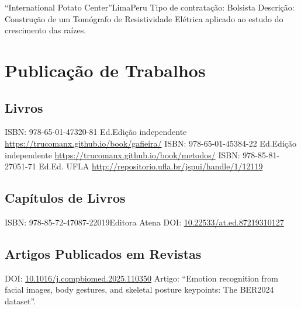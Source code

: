 \documentclass[11pt,a4paper,sans]{moderncv} %
\newcommand{\doiurl}[1]{\href{https://doi.org/#1}{#1}}
\begin{document}
		      {``International Potato Center''}{Lima}{Peru}
		      {Tipo de contratação: Bolsista\newline{}
		      Descrição: Construção  de  um  Tomógrafo  de  Resistividade 
		      Elétrica  aplicado ao  estudo  do  crescimento  das  raízes.}


\section{Publicação de Trabalhos}
\subsection{Livros}
	      {ISBN: 978-65-01-47320-8}{1 Ed.}{Edição independente}
	      {\url{https://trucomanx.github.io/book/gafieira/}}
	      {ISBN: 978-65-01-45384-2}{2 Ed.}{Edição independente}
	      {\url{https://trucomanx.github.io/book/metodos/}}
	      {ISBN: 978-85-81-27051-7}{1 Ed.}{Ed. UFLA}
	      {\url{http://repositorio.ufla.br/jspui/handle/1/12119}}

\subsection{Capítulos de Livros}
	      {ISBN: 978-85-72-47087-2}{2019}{Editora Atena}
	      {DOI: \doiurl{10.22533/at.ed.87219310127}}

\subsection{Artigos Publicados em Revistas}

	      {DOI: \doiurl{10.1016/j.compbiomed.2025.110350} }{}{}
	      {Artigo: ``Emotion recognition from facial images, body gestures, and skeletal posture keypoints: The BER2024 dataset''.}
	      
\end{document}
